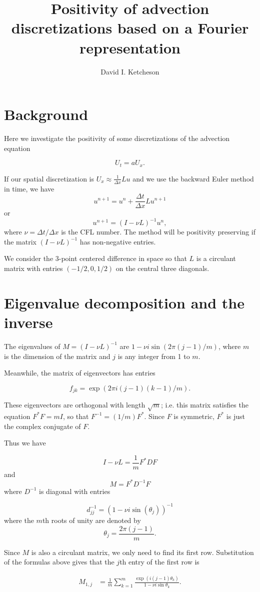 \documentclass[a4paper]{article}
\title{Positivity of advection discretizations based on a Fourier representation}
\author{David I. Ketcheson}
\begin{document}
\maketitle

\section{Background}
Here we investigate the positivity of some discretizations of the advection equation

$$ U_t = a U_x.$$

If our spatial discretization is $U_x \approx \frac{1}{\Delta x} L u$ and we use the backward Euler method in time, we have
$$u^{n+1} = u^n + \frac{\Delta t}{\Delta x} L u^{n+1}$$
or
$$u^{n+1} = (I-\nu L)^{-1} u^n,$$
where $\nu = \Delta t/\Delta x$ is the CFL number.  The method will be positivity preserving if the matrix
$(I-\nu L)^{-1}$ has non-negative entries.

We consider the 3-point centered difference in space so that $L$ is a
circulant matrix with entries $(-1/2, 0, 1/2)$ on the central three diagonals.

\section{Eigenvalue decomposition and the inverse}
The eigenvalues of $M=(I-\nu L)^{-1}$ are $1-\nu i \sin(2\pi (j-1)/m)$,
where $m$ is the dimension of the matrix and $j$ is any integer from 1 to $m$.

Meanwhile, the matrix of eigenvectors has entries

$$f_{jk} = \exp(2\pi i (j-1) (k-1)/m).$$

These eigenvectors are orthogonal with length $\sqrt{m}$; i.e.
this matrix satisfies the equation $F^* F = m I$, so
that $F^{-1} = (1/m)F^*$.  Since $F$ is symmetric, $F^*$ is just the
complex conjugate of $F$.

Thus we have

$$I - \nu L = \frac{1}{m} F^* D F$$
and
$$M = F^* D^{-1} F$$
where $D^{-1}$ is diagonal with entries

$$d^{-1}_{jj} = (1-\nu i \sin(\theta_j))^{-1}$$
where the $m$th roots of unity are denoted by
$$\theta_j = \frac{2 \pi (j-1)}{m}.$$

Since $M$ is also a circulant matrix, we only need to find its
first row.  Substitution of the formulas above gives that the $j$th
entry of the first row is

\begin{align} \label{firstrow}
    M_{1,j} & = \frac{1}{m} \sum_{k=1}^m \frac{\exp\left(i(j-1)\theta_k\right)}{1-\nu i \sin\theta_k}.
\end{align}
\end{document}
